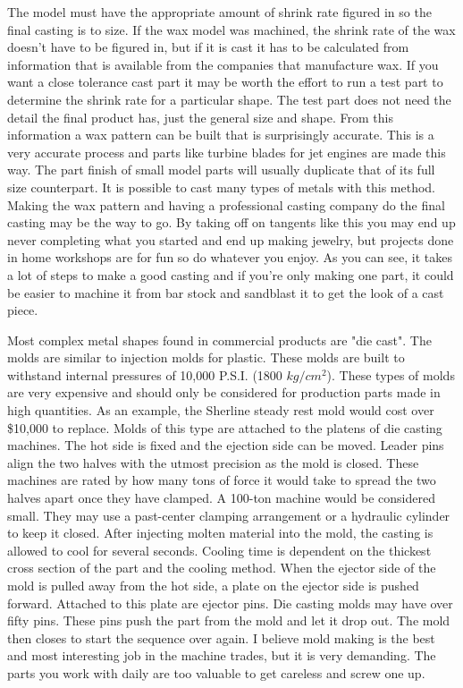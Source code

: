 
The model must have the appropriate amount of shrink rate figured in so the
final casting is to size. If the wax model was machined, the shrink rate of the
wax doesn't have to be figured in, but if it is cast it has to be calculated
from information that is available from the companies that manufacture wax. If
you want a close tolerance cast part it may be worth the effort to run a test
part to determine the shrink rate for a particular shape. The test part does not
need the detail the final product has, just the general size and shape. From
this information a wax pattern can be built that is surprisingly accurate. This
is a very accurate process and parts like turbine blades for jet engines are
made this way. The part finish of small model parts will usually duplicate that
of its full size counterpart. It is possible to cast many types of metals with
this method. Making the wax pattern and having a professional casting company do
the final casting may be the way to go. By taking off on tangents like this you
may end up never completing what you started and end up making jewelry, but
projects done in home workshops are for fun so do whatever you enjoy. As you can
see, it takes a lot of steps to make a good casting and if you're only making
one part, it could be easier to machine it from bar stock and sandblast it to
get the look of a cast piece.


Most complex metal shapes found in commercial products are "die cast". The molds
are similar to injection molds for plastic. These molds are built to withstand
internal pressures of 10,000 P.S.I. (1800 $kg/cm^{2}$). These types of molds
are very expensive and should only be considered for production parts made in high
quantities. As an example, the Sherline steady rest mold would cost over
\$10,000 to replace. Molds of this type are attached to the platens of die casting
machines. The hot side is fixed and the ejection side can be moved. Leader pins
align the two halves with the utmost precision as the mold is closed. These
machines are rated by how many tons of force it would take to spread the two
halves apart once they have clamped. A 100-ton machine would be considered
small. They may use a past-center clamping arrangement or a hydraulic cylinder
to keep it closed. After injecting molten material into the mold, the casting is
allowed to cool for several seconds. Cooling time is dependent on the thickest
cross section of the part and the cooling method. When the ejector side of the
mold is pulled away from the hot side, a plate on the ejector side is pushed
forward. Attached to this plate are ejector pins. Die casting molds may have
over fifty pins. These pins push the part from the mold and let it drop out. The
mold then closes to start the sequence over again. I believe mold making is the
best and most interesting job in the machine trades, but it is very demanding.
The parts you work with daily are too valuable to get careless and screw one up.

